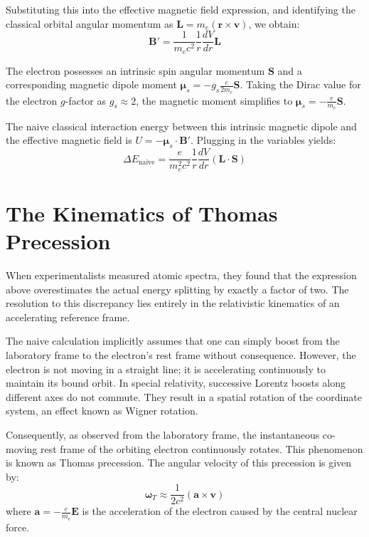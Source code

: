\documentclass[12pt]{article}
\begin{document}
Substituting this into the effective magnetic field expression, and identifying the classical orbital angular momentum as $\mathbf{L} = m_e (\mathbf{r} \times \mathbf{v})$, we obtain:
\begin{equation}
    \mathbf{B}' = \frac{1}{m_e c^2} \frac{1}{r} \frac{dV}{dr} \mathbf{L}
\end{equation}

The electron possesses an intrinsic spin angular momentum $\mathbf{S}$ and a corresponding magnetic dipole moment $\boldsymbol{\mu}_s = -g_s \frac{e}{2m_e} \mathbf{S}$. Taking the Dirac value for the electron $g$-factor as $g_s \approx 2$, the magnetic moment simplifies to $\boldsymbol{\mu}_s = -\frac{e}{m_e} \mathbf{S}$. 

The naive classical interaction energy between this intrinsic magnetic dipole and the effective magnetic field is $U = -\boldsymbol{\mu}_s \cdot \mathbf{B}'$. Plugging in the variables yields:
\begin{equation}
    \Delta E_{\text{naive}} = \frac{e}{m_e^2 c^2} \frac{1}{r} \frac{dV}{dr} (\mathbf{L} \cdot \mathbf{S})
\end{equation}

\section{The Kinematics of Thomas Precession}
When experimentalists measured atomic spectra, they found that the expression above overestimates the actual energy splitting by exactly a factor of two. The resolution to this discrepancy lies entirely in the relativistic kinematics of an accelerating reference frame.

The naive calculation implicitly assumes that one can simply boost from the laboratory frame to the electron's rest frame without consequence. However, the electron is not moving in a straight line; it is accelerating continuously to maintain its bound orbit. In special relativity, successive Lorentz boosts along different axes do not commute. They result in a spatial rotation of the coordinate system, an effect known as Wigner rotation.

Consequently, as observed from the laboratory frame, the instantaneous co-moving rest frame of the orbiting electron continuously rotates. This phenomenon is known as Thomas precession. The angular velocity of this precession is given by:
\begin{equation}
    \boldsymbol{\omega}_T \approx \frac{1}{2c^2} (\mathbf{a} \times \mathbf{v})
\end{equation}
where $\mathbf{a} = -\frac{e}{m_e} \mathbf{E}$ is the acceleration of the electron caused by the central nuclear force. 
\end{document}
